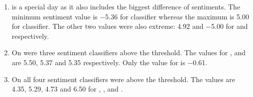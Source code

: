 
\begin{enumerate}
    \item 
         is a special day as it also includes the biggest difference of sentiments.
        The minimum sentiment value is \num{-5.36} for \nb{} classifier whereas the maximum is \num{5.00} for \me{} classifier.
        The other two values were also extreme: \num{4.92} and \num{-5.00} for \tb{} and \svm{} respectively.

    \item
        On  were three sentiment classifiers above the threshold.
        The values for \tb{}, \nb{} and \me{} are \num{5.50}, \num{5.37} and \num{5.35} respectively.
        Only the value for \svm{} is \num{-0.61}.

    \item
        On  all four sentiment classifiers were above the threshold.
        The values are \num{4.35}, \num{5.29}, \num{4.73} and \num{6.50} for \ftb{}, \fnb{}, \fme{} and \fsvm{}.
\end{enumerate}

\begin{figure}[hbt]
    \centering
    
    \caption{\sentimentsCaption{\hyundai}}
    \label{fig:analysis-sentiments-hyundai}
\end{figure} 


